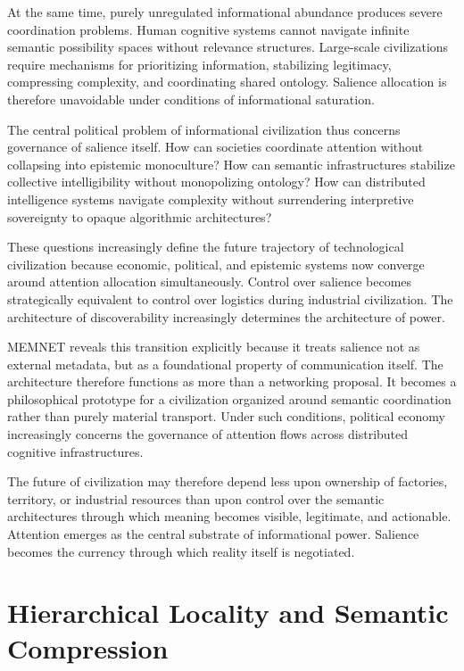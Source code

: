 \documentclass[11pt,a4paper]{article}
\begin{document}
At the same time, purely unregulated informational abundance produces severe coordination problems. Human cognitive systems cannot navigate infinite semantic possibility spaces without relevance structures. Large-scale civilizations require mechanisms for prioritizing information, stabilizing legitimacy, compressing complexity, and coordinating shared ontology. Salience allocation is therefore unavoidable under conditions of informational saturation.

The central political problem of informational civilization thus concerns governance of salience itself. How can societies coordinate attention without collapsing into epistemic monoculture? How can semantic infrastructures stabilize collective intelligibility without monopolizing ontology? How can distributed intelligence systems navigate complexity without surrendering interpretive sovereignty to opaque algorithmic architectures?

These questions increasingly define the future trajectory of technological civilization because economic, political, and epistemic systems now converge around attention allocation simultaneously. Control over salience becomes strategically equivalent to control over logistics during industrial civilization. The architecture of discoverability increasingly determines the architecture of power.

MEMNET reveals this transition explicitly because it treats salience not as external metadata, but as a foundational property of communication itself. The architecture therefore functions as more than a networking proposal. It becomes a philosophical prototype for a civilization organized around semantic coordination rather than purely material transport. Under such conditions, political economy increasingly concerns the governance of attention flows across distributed cognitive infrastructures.

The future of civilization may therefore depend less upon ownership of factories, territory, or industrial resources than upon control over the semantic architectures through which meaning becomes visible, legitimate, and actionable. Attention emerges as the central substrate of informational power. Salience becomes the currency through which reality itself is negotiated.

\section{Hierarchical Locality and Semantic Compression}
\end{document}
